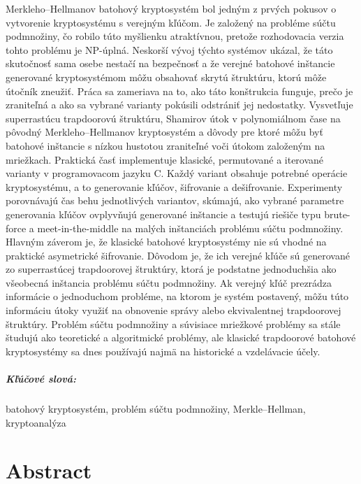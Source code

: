 \documentclass[12pt, twoside]{book}
\begin{document}
Merkleho--Hellmanov batohový kryptosystém bol jedným z prvých pokusov o
vytvorenie kryptosystému s verejným kľúčom. Je založený na probléme súčtu
podmnožiny, čo robilo túto myšlienku atraktívnou, pretože rozhodovacia verzia
tohto problému je NP-úplná. Neskorší vývoj týchto systémov ukázal, že táto
skutočnosť sama osebe nestačí na bezpečnosť a že verejné batohové inštancie
generované kryptosystémom môžu obsahovať skrytú štruktúru, ktorú môže útočník
zneužiť. Práca sa zameriava na to, ako táto konštrukcia funguje, prečo je
zraniteľná a ako sa vybrané varianty pokúsili odstrániť jej nedostatky.
Vysvetľuje superrastúcu trapdoorovú štruktúru, Shamirov útok v polynomiálnom
čase na pôvodný Merkleho--Hellmanov kryptosystém a dôvody pre ktoré môžu byť
batohové inštancie s nízkou hustotou zraniteľné voči útokom založeným na
mriežkach. Praktická časť implementuje klasické, permutované a iterované
varianty v programovacom jazyku C. Každý variant obsahuje potrebné operácie
kryptosystému, a to generovanie kľúčov, šifrovanie a dešifrovanie. Experimenty
porovnávajú čas behu jednotlivých variantov, skúmajú, ako vybrané parametre
generovania kľúčov ovplyvňujú generované inštancie a testujú riešiče typu
brute-force a meet-in-the-middle na malých inštanciách problému súčtu
podmnožiny. Hlavným záverom je, že klasické batohové kryptosystémy nie sú
vhodné na praktické asymetrické šifrovanie. Dôvodom je, že ich verejné kľúče sú
generované zo superrastúcej trapdoorovej štruktúry, ktorá je podstatne
jednoduchšia ako všeobecná inštancia problému súčtu podmnožiny. Ak verejný kľúč
prezrádza informácie o jednoduchom probléme, na ktorom je systém postavený,
môžu túto informáciu útoky využiť na obnovenie správy alebo ekvivalentnej
trapdoorovej štruktúry. Problém súčtu podmnožiny a súvisiace mriežkové problémy
sa stále študujú ako teoretické a algoritmické problémy, ale klasické
trapdoorové batohové kryptosystémy sa dnes používajú najmä na historické a
vzdelávacie účely.

\paragraph*{Kľúčové slová:} batohový kryptosystém, problém súčtu podmnožiny, Merkle--Hellman, kryptoanalýza


\newpage 
\chapter*{Abstract}
\end{document}
